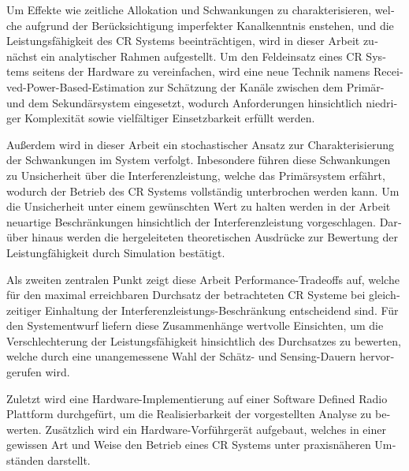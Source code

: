 \begin{otherlanguage}{german}
Um Effekte wie zeitliche Allokation und Schwankungen zu charakterisieren, welche aufgrund der Ber\"ucksichtigung imperfekter Kanalkenntnis enstehen, und die Leistungsf\"ahigkeit des CR Systems beeintr\"achtigen, wird in dieser Arbeit zun\"achst ein analytischer Rahmen aufgestellt. Um den Feldeinsatz eines CR Systems seitens der Hardware zu vereinfachen, wird eine neue Technik namens Received-Power-Based-Estimation zur Sch\"atzung der Kan\"ale  zwischen dem Prim\"ar- und dem Sekund\"arsystem eingesetzt, wodurch Anforderungen hinsichtlich niedriger Komplexit\"at sowie vielf\"altiger Einsetzbarkeit erf\"ullt werden. 

Au\ss erdem wird in dieser Arbeit ein stochastischer Ansatz zur Charakterisierung der Schwankungen im System verfolgt. Inbesondere f\"uhren diese Schwankungen zu Unsicherheit \"uber die Interferenzleistung, welche das Prim\"arsystem erf\"ahrt, wodurch der Betrieb des CR Systems vollst\"andig unterbrochen werden kann. Um die Unsicherheit unter einem gew\"unschten Wert zu halten werden in der Arbeit neuartige Beschr\"ankungen hinsichtlich der Interferenzleistung vorgeschlagen. Dar\"uber hinaus werden die hergeleiteten theoretischen Ausdr\"ucke zur Bewertung der Leistungf\"ahigkeit durch Simulation best\"atigt. 

Als zweiten zentralen Punkt zeigt diese Arbeit Performance-Tradeoffs auf, welche f\"ur den maximal erreichbaren Durchsatz der betrachteten CR Systeme bei gleichzeitiger Einhaltung der Interferenzleistungs-Beschr\"ankung entscheidend sind. F\"ur den Systementwurf liefern diese Zusammenh\"ange wertvolle Einsichten, um die Verschlechterung der Leistungsf\"ahigkeit hinsichtlich des Durchsatzes zu bewerten, welche durch eine unangemessene Wahl der Sch\"atz- und Sensing-Dauern hervorgerufen wird.

Zuletzt wird eine Hardware-Implementierung auf einer Software Defined Radio Plattform durchgef\"urt, um die Realisierbarkeit der vorgestellten Analyse zu bewerten. Zus\"atzlich wird ein Hardware-Vorf\"uhrger\"at aufgebaut, welches in einer gewissen Art und Weise den Betrieb eines CR Systems unter praxisn\"aheren Umst\"anden darstellt.
\end{otherlanguage}
\cleardoublepage
